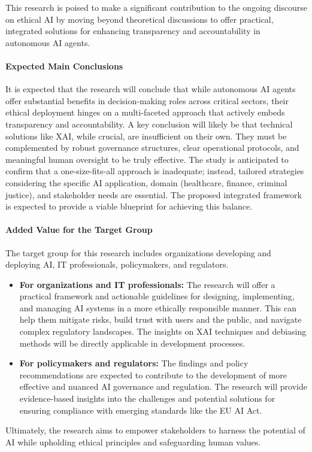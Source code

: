\documentclass[english]{hogent-article}
\begin{document}
This research is poised to make a significant contribution to the ongoing discourse on ethical AI by moving beyond theoretical discussions to offer practical, integrated solutions for enhancing transparency and accountability in autonomous AI agents.

\paragraph{Expected Main Conclusions}
It is expected that the research will conclude that while autonomous AI agents offer substantial benefits in decision-making roles across critical sectors, their ethical deployment hinges on a multi-faceted approach that actively embeds transparency and accountability. A key conclusion will likely be that technical solutions like XAI, while crucial, are insufficient on
their own. They must be complemented by robust governance structures, clear operational protocols, and meaningful human oversight to be truly effective. The study is anticipated to confirm that a one-size-fits-all approach is inadequate; instead, tailored strategies considering the specific AI application, domain (healthcare, finance, criminal justice), and stakeholder needs are essential. The proposed integrated framework is expected to provide a viable blueprint for achieving this balance.

\paragraph{Added Value for the Target Group}
The target group for this research includes organizations developing and deploying AI, IT professionals, policymakers, and regulators.
\begin{itemize}
    \item \textbf{For organizations and IT professionals:}
    The research will offer a practical framework and actionable guidelines for designing, implementing, and managing AI systems in a more ethically responsible manner. This can help them mitigate risks, build trust with users and the public, and navigate complex regulatory landscapes. The insights on XAI techniques and debiasing methods will be directly applicable in development processes.
    \newpage
    \item \textbf{For policymakers and regulators:}
    The findings and policy recommendations are expected to contribute to the development of more effective and nuanced AI governance and regulation. The research will provide evidence-based insights into the challenges and potential solutions for ensuring compliance with emerging standards like the EU AI Act.
\end{itemize}
Ultimately, the research aims to empower stakeholders to harness the potential of AI while upholding ethical principles and safeguarding human values.
\end{document}
